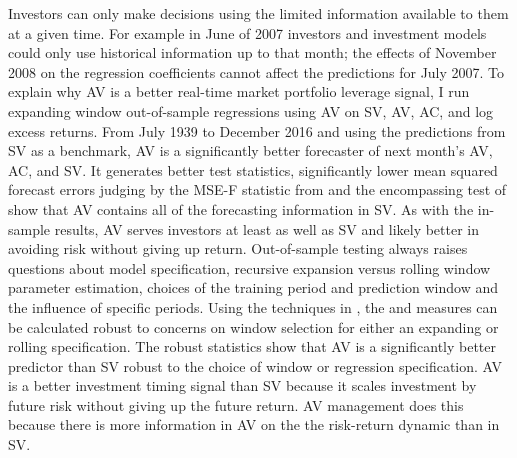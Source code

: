 Investors can only make decisions using the limited information available to them at a given time. For example in June of 2007 investors and investment models could only use historical information up to that month; the effects of November 2008 on the regression coefficients cannot affect the predictions for July 2007. %
To explain why AV is a better real-time market portfolio leverage signal, I run expanding window out-of-sample regressions using AV on SV, AV, AC, and log excess returns. From July 1939 to December 2016 and using the predictions from SV as a benchmark, AV is a significantly better forecaster of next month’s AV, AC, and SV. It generates better \citet{Diebold1995} test statistics, significantly lower mean squared forecast errors judging by the MSE-F statistic from \citet{mccracken_asymptotics_2007} and the encompassing test of \citet{harvey_tests_1998} show that AV contains all of the forecasting information in SV. As with the in-sample results, AV serves investors at least as well as SV and likely better in avoiding risk without giving up return. Out-of-sample testing always raises questions about model specification, recursive expansion versus rolling window parameter estimation, choices of the training period and prediction window and the influence of specific periods. Using the techniques in \citet{rossi_out--sample_2012}, the \citet{Diebold1995} and \citet{harvey_tests_1998} measures can be calculated robust to concerns on window selection for either an expanding or rolling specification.
The \citet{rossi_out--sample_2012}  robust statistics show that AV is a significantly better predictor than SV robust to the choice of window or regression specification. %
AV is a better investment timing signal than SV because it scales investment by future risk without giving up the future return. AV management does this because there is more information in AV on the the risk-return dynamic than in SV.

